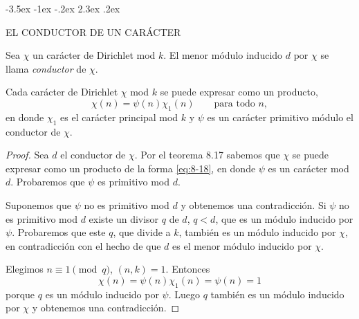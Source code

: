 \documentclass[12pt,a4paper]{book}
\makeatletter
\renewcommand\section{\@startsection{section}{1}{\z@}%
  {-3.5ex \@plus -1ex \@minus -.2ex}%
  {2.3ex \@plus .2ex}%
  {\normalfont\Large\bfseries\raggedright}}
\makeatother
\begin{document}
    \section{EL CONDUCTOR DE UN CARÁCTER}
    \begin{definicion}[Conductor]
        Sea $\chi$ un carácter de Dirichlet mod $k$. El menor módulo inducido $d$ por
        $\chi$ se llama \textit{conductor} de $\chi$.
    \end{definicion}

    \begin{teorema}
        Cada carácter de Dirichlet $\chi$ mod $k$ se puede expresar como un producto,
        \begin{equation}\label{eq:8-18}
            \chi(n)=\psi(n)\chi_{1}(n)\qquad\text{para todo }n,
        \end{equation}
        en donde $\chi_{1}$ es el carácter principal mod $k$ y $\psi$ es un carácter primitivo
        módulo el conductor de $\chi$.
    \end{teorema}

    \begin{proof}
        Sea $d$ el conductor de $\chi$. Por el teorema 8.17 sabemos que $\chi$ se puede
        expresar como un producto de la forma \eqref{eq:8-18}, en donde $\psi$ es un
        carácter mod $d$. Probaremos que $\psi$ es primitivo mod $d$.

        Suponemos que $\psi$ no es primitivo mod $d$ y obtenemos una contradicción. Si
        $\psi$ no es primitivo mod $d$ existe un divisor $q$ de $d$, $q<d$, que es un módulo
        inducido por $\psi$. Probaremos que este $q$, que divide a $k$, también es un módulo
        inducido por $\chi$, en contradicción con el hecho de que $d$ es el menor módulo
        inducido por $\chi$.

        Elegimos $n\equiv1\pmod{q}$, $(n,k)=1$. Entonces
        \begin{equation*}
            \chi(n)=\psi(n)\chi_{1}(n)=\psi(n)=1
        \end{equation*}
        porque $q$ es un módulo inducido por $\psi$. Luego $q$ también es un módulo inducido
        por $\chi$ y obtenemos una contradicción.
    \end{proof}
\end{document}
